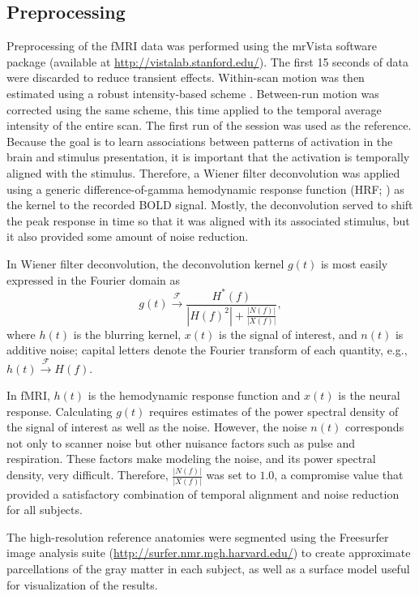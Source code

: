 \documentclass[5p,authoryear]{elsarticle}
\begin{document}
\subsection{Preprocessing}
Preprocessing of the fMRI data was performed using the mrVista software package (available at \url{http://vistalab.stanford.edu/}). 
The first 15 seconds of data  were discarded to reduce transient effects.
Within-scan motion was then estimated using a robust intensity-based scheme \citep{Nestares2000}. 
Between-run motion was corrected using the same scheme, this time applied to the temporal average intensity of the entire scan. 
The first run of the session was used as the reference. 
Because the goal is to learn associations between patterns of activation in the brain and stimulus presentation, it is important that the activation is temporally aligned with the stimulus.
Therefore, a Wiener filter deconvolution \citep{Poor1980} was applied using a generic difference-of-gamma hemodynamic response function (HRF; \cite{Glover1999}) as the kernel to the recorded BOLD signal.
Mostly, the deconvolution served to shift the peak response in time so that it was aligned with its associated stimulus, but it also provided some amount of noise reduction.

In Wiener filter deconvolution, the deconvolution kernel $g(t)$ is most easily expressed in the Fourier domain as
\begin{equation}
g(t) \xrightarrow{\mathcal{F}} \frac{H^{*}(f)}{\left|H(f)^{2}\right| + \frac{\left| N(f) \right|}{\left| X(f) \right|}},
\end{equation}
where $h(t)$ is the blurring kernel, $x(t)$ is the signal of interest, and $n(t)$ is additive noise; capital letters denote the Fourier transform of each quantity, e.g., $h(t) \xrightarrow{\mathcal{F}} H(f)$.

In fMRI, $h(t)$ is the hemodynamic response function and $x(t)$ is the neural response.
Calculating $g(t)$ requires estimates of the power spectral density of the signal of interest as well as the noise.
However, the noise $n(t)$ corresponds not only to scanner noise but other nuisance factors such as pulse and respiration.
These factors make modeling the noise, and its power spectral density, very difficult.
Therefore, $\frac{\left| N(f) \right|}{\left| X(f) \right|}$ was set to $1.0$, a compromise value that provided a satisfactory combination of temporal alignment and noise reduction for all subjects.

The high-resolution reference anatomies were segmented using the Freesurfer image analysis suite (\url{http://surfer.nmr.mgh.harvard.edu/}) to create approximate parcellations of the gray matter in each subject, as well as a surface model useful for visualization of the results.
\end{document}
